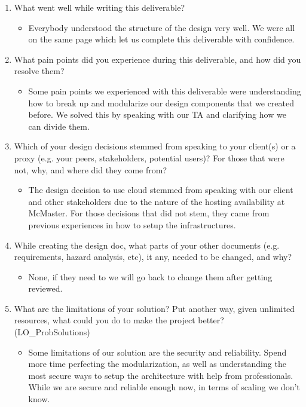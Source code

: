 \documentclass[12pt, titlepage]{article}
\begin{document}
\begin{enumerate}
  \item What went well while writing this deliverable? 
    \begin{itemize}
      \item Everybody understood the structure of the design very well. We were all on the same page which let us complete this deliverable with confidence.
    \end{itemize}
    \item What pain points did you experience during this deliverable, and how
      did you resolve them?
    \begin{itemize}
      \item Some pain points we experienced with this deliverable were understanding how to break up and modularize our design components that we created before. We solved this by speaking with our TA and clarifying how we can divide them.
    \end{itemize}
    \item Which of your design decisions stemmed from speaking to your client(s)
    or a proxy (e.g. your peers, stakeholders, potential users)? For those that
    were not, why, and where did they come from?
    \begin{itemize}
      \item The design decision to use cloud stemmed from speaking with our client and other stakeholders due to the nature of the hosting availability at McMaster. For those decisions that did not stem, they came from previous experiences in how to setup the infrastructures.
    \end{itemize}
    \item While creating the design doc, what parts of your other documents (e.g.
    requirements, hazard analysis, etc), it any, needed to be changed, and why?
    \begin{itemize}
      \item None, if they need to we will go back to change them after getting reviewed.
    \end{itemize}
    \item What are the limitations of your solution?  Put another way, given
    unlimited resources, what could you do to make the project better? (LO\_ProbSolutions)
    \begin{itemize}
      \item Some limitations of our solution are the security and reliability. Spend more time perfecting the modularization, as well as understanding the most secure ways to setup the architecture with help from professionals. While we are secure and reliable enough now, in terms of scaling we don't know.

\end{itemize}
\end{enumerate}
\end{document}
